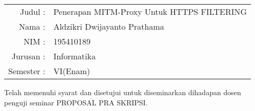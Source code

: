 \documentclass[../PROPOSAL_PRA_SKRIPSI_ALDZIKRI_DWIJAYANTO_PRATHAMA.tex]{subfiles}
\begin{document}
\vspace{5ex}
\begin{tabular}{rl}
  Judul    :& Penerapan MITM-Proxy Untuk HTTPS FILTERING\\[5ex]
  Nama     :& Aldzikri Dwijayanto Prathama\\[5ex]
  NIM      :& 195410189\\[5ex]
  Jurusan  :& Informatika\\[5ex]
  Semester :& VI(Enam)\\[5ex]
\end{tabular}
\begin{center}
  Telah memenuhi syarat dan disetujui untuk diseminarkan
  dihadapan dosen penguji seminar PROPOSAL PRA SKRIPSI.
\end{center}
\end{document}
